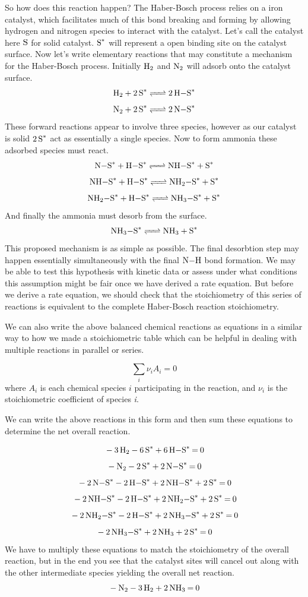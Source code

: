 \documentclass[
]{article}
\begin{document}
So how does this reaction happen? The Haber-Bosch process relies on a iron catalyst, which facilitates much of this bond breaking and forming by allowing hydrogen and nitrogen species to interact with the catalyst. Let's call the catalyst here \(\ce{S}\) for solid catalyst. \(\ce{S^*}\) will represent a open binding site on the catalyst surface. Now let's write elementary reactions that may constitute a mechanism for the Haber-Bosch process. Initially \(\ce{H2}\) and \(\ce{N2}\) will adsorb onto the catalyst surface.
\[ \ce{H2 + 2S^* <=> 2H-S^*} \]
\[ \ce{N2 + 2S^* <=> 2N-S^*} \]
These forward reactions appear to involve three species, however as our catalyst is solid \(\ce{2S^*}\) act as essentially a single species. Now to form ammonia these adsorbed species must react.
\[ \ce{ N-S^* + H-S^* <=> NH-S^* + S^*} \]
\[ \ce{ NH-S^* + H-S^* <=> NH2-S^* + S^*} \]
\[ \ce{ NH2-S^* + H-S^* <=> NH3-S^* + S^*} \]
And finally the ammonia must desorb from the surface.
\[ \ce{NH3-S^* <=> NH3 + S^*} \]
This proposed mechanism is as simple as possible. The final desorbtion step may happen essentially simultaneously with the final \(\ce{N-H}\) bond formation. We may be able to test this hypothesis with kinetic data or assess under what conditions this assumption might be fair once we have derived a rate equation. But before we derive a rate equation, we should check that the stoichiometry of this series of reactions is equivalent to the complete Haber-Bosch reaction stoichiometry.

We can also write the above balanced chemical reactions as equations in a similar way to how we made a stoichiometric table which can be helpful in dealing with multiple reactions in parallel or series.

\[\sum_i \nu_i A_i = 0\]
where \(A_i\) is each chemical species \(i\) participating in the reaction, and \(\nu_i\) is the stoichiometric coefficient of species \emph{i}.

We can write the above reactions in this form and then sum these equations to determine the net overall reaction.

\[\ce{ - 3H2 - 6S^* + 6H-S^* = 0} \]
\[ \ce{- N2 - 2S^* + 2N-S^* = 0} \]
\[  \ce{ - 2N-S^* - 2H-S^* + 2NH-S^* + 2S^* = 0} \]
\[ \ce{ - 2NH-S^* - 2H-S^* + 2NH2-S^* + 2S^* = 0} \]
\[ \ce{- 2NH2-S^* - 2H-S^* + 2NH3-S^* + 2S^* = 0} \]
\[ \ce{- 2NH3-S^* + 2NH3 + 2S^* = 0} \]
We have to multiply these equations to match the stoichiometry of the overall reaction, but in the end you see that the catalyst sites will cancel out along with the other intermediate species yielding the overall net reaction.
\[\ce{ - N2 - 3H2 + 2NH3 = 0 }\]
\end{document}
